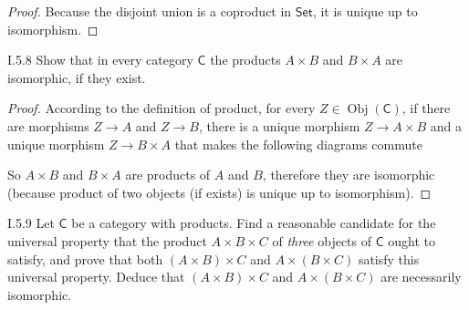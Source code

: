 \begin{proof}
	Because the disjoint union is a coproduct in $\mathsf{Set}$, it is unique up to isomorphism.
\end{proof}

\begin{exercise}{I.5.8}
	Show that in every category $\mathsf{C}$ the products $A\times B$ and $B\times A$ are isomorphic, if they exist.
\end{exercise}

\begin{proof}
	According to the definition of product, for every $Z \in \operatorname{Obj}(\mathsf{C})$, if there are morphisms $Z \to A$ and $Z \to B$, there is a unique morphism $Z \to A\times B$ and a unique morphism $Z \to B\times A$ that makes the following diagrams commute
	\FloatBarrier
	\begin{figure}[htp]
		\centering
		\qquad
	\end{figure}
	\FloatBarrier

	So $A\times B$ and $B\times A$ are products of $A$ and $B$, therefore they are isomorphic (because product of two objects (if exists) is unique up to isomorphism).
\end{proof}

\begin{exercise}{I.5.9}
	Let $\mathsf{C}$ be a category with products. Find a reasonable candidate for the universal property that the product $A\times B\times C$ of \textit{three} objects of $\mathsf{C}$ ought to satisfy, and prove that both $(A\times B)\times C$ and $A\times (B\times C)$ satisfy this universal property. Deduce that $(A\times B)\times C$ and $A\times (B\times C)$ are necessarily isomorphic.
\end{exercise}

